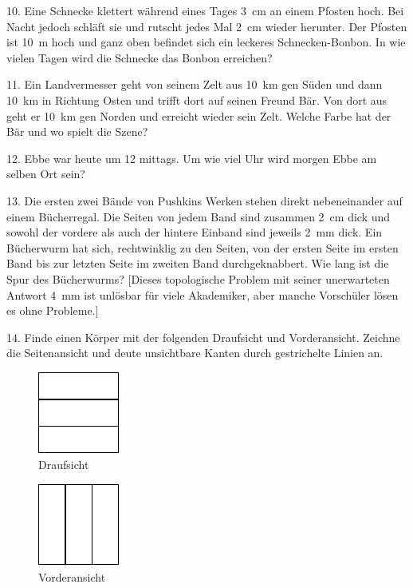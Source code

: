 \begin{problem}{10.}
	Eine Schnecke klettert während eines Tages \SI{3}{\cm} an einem Pfosten hoch. Bei Nacht jedoch schläft sie und rutscht jedes Mal \SI{2}{\cm} wieder herunter. Der Pfosten ist \SI{10}{\metre} hoch und ganz oben befindet sich ein leckeres Schnecken-Bonbon. In wie vielen Tagen wird die Schnecke das Bonbon erreichen?
\end{problem}

\begin{problem}{11.}
	Ein Landvermesser geht von seinem Zelt aus \SI{10}{\km} gen Süden und dann \SI{10}{\km} in Richtung Osten und trifft dort auf seinen Freund Bär. Von dort aus geht er \SI{10}{\km} gen Norden und erreicht wieder sein Zelt. Welche Farbe hat der Bär und wo spielt die Szene?
\end{problem}

\begin{problem}{12.}
	Ebbe war heute um \SI{12}{\uhr} mittags. Um wie viel Uhr wird morgen Ebbe am selben Ort sein?
\end{problem}

\begin{problem}{13.}
	Die ersten zwei Bände von Pushkins Werken stehen direkt nebeneinander auf einem Bücherregal. Die Seiten von jedem Band sind zusammen \SI{2}{\cm} dick und sowohl der vordere als auch der hintere Einband sind jeweils \SI{2}{\mm} dick. Ein Bücherwurm hat sich, rechtwinklig zu den Seiten, von der ersten Seite im ersten Band bis zur letzten Seite im zweiten Band durchgeknabbert. Wie lang ist die Spur des Bücherwurms? [Dieses topologische Problem mit seiner unerwarteten Antwort \SI{4}{\mm} ist unlösbar für viele Akademiker, aber manche Vorschüler lösen es ohne Probleme.]
\end{problem}

\begin{problem}{14.}
	Finde einen Körper mit der folgenden Draufsicht und Vorderansicht. Zeichne die Seitenansicht und deute unsichtbare Kanten durch gestrichelte Linien an. 
	\begin{figure}
		\footnotesize
		\null\hfill
		\parbox{0.2\linewidth}{\centering\includegraphics{taskbook-99}\\Draufsicht}
		\hfill
		\parbox{0.2\linewidth}{\centering\includegraphics{taskbook-98}\\Vorderansicht}
		\hfill\null
	\end{figure}
\end{problem}


